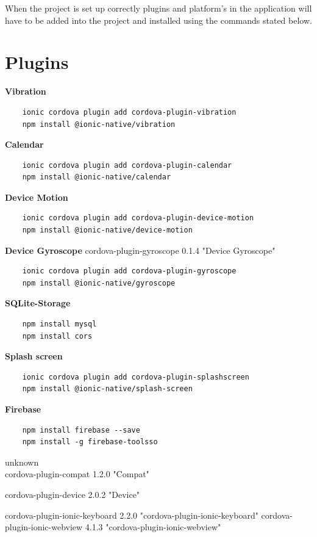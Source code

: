 \documentclass[a4paper,12pt]{report}
\begin{document}
When the project is set up correctly plugins and platform's in the application will have to be added into the project and installed using the commands stated below.\\
\section{Plugins}
\textbf{Vibration}
\begin{lstlisting}
    ionic cordova plugin add cordova-plugin-vibration
    npm install @ionic-native/vibration
\end{lstlisting}

\textbf{Calendar}
\begin{lstlisting}
    ionic cordova plugin add cordova-plugin-calendar
    npm install @ionic-native/calendar
\end{lstlisting}


\textbf{Device Motion}
\begin{lstlisting}
    ionic cordova plugin add cordova-plugin-device-motion
    npm install @ionic-native/device-motion
\end{lstlisting}{}


\textbf{Device Gyroscope} cordova-plugin-gyroscope 0.1.4 "Device Gyroscope"
\begin{lstlisting}
    ionic cordova plugin add cordova-plugin-gyroscope
    npm install @ionic-native/gyroscope
\end{lstlisting}


\textbf{SQLite-Storage}
\begin{lstlisting}
    npm install mysql
    npm install cors
\end{lstlisting}


\textbf{Splash screen}
\begin{lstlisting}
    ionic cordova plugin add cordova-plugin-splashscreen
    npm install @ionic-native/splash-screen
\end{lstlisting}{}


\textbf{Firebase}   
\begin{lstlisting}
    npm install firebase --save
    npm install -g firebase-toolsso
\end{lstlisting}





unknown\\
cordova-plugin-compat 1.2.0 "Compat"

cordova-plugin-device 2.0.2 "Device"

cordova-plugin-ionic-keyboard 2.2.0 "cordova-plugin-ionic-keyboard"
cordova-plugin-ionic-webview 4.1.3 "cordova-plugin-ionic-webview"
\end{document}
